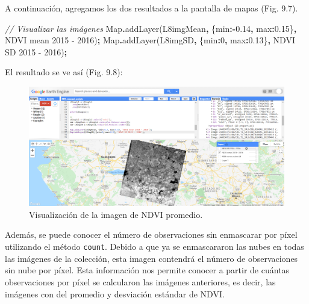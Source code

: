 \documentclass[
  12pt,
  letterpaper,
  twoside]{book}
\newenvironment{Shaded}{\begin{snugshade}}{\end{snugshade}}
\newcommand{\BuiltInTok}[1]{#1}
\newcommand{\CommentTok}[1]{\textcolor[rgb]{0.56,0.35,0.01}{\textit{#1}}}
\newcommand{\DataTypeTok}[1]{\textcolor[rgb]{0.13,0.29,0.53}{#1}}
\newcommand{\DecValTok}[1]{\textcolor[rgb]{0.00,0.00,0.81}{#1}}
\newcommand{\FloatTok}[1]{\textcolor[rgb]{0.00,0.00,0.81}{#1}}
\newcommand{\FunctionTok}[1]{\textcolor[rgb]{0.00,0.00,0.00}{#1}}
\newcommand{\NormalTok}[1]{#1}
\newcommand{\OperatorTok}[1]{\textcolor[rgb]{0.81,0.36,0.00}{\textbf{#1}}}
\newcommand{\StringTok}[1]{\textcolor[rgb]{0.31,0.60,0.02}{#1}}
\begin{document}
A continuación, agregamos los dos resultados a la pantalla de mapas (Fig. 9.7).

\begin{Shaded}
\begin{Highlighting}[]
\CommentTok{// Visualizar las imágenes}
\BuiltInTok{Map}\OperatorTok{.}\FunctionTok{addLayer}\NormalTok{(L8imgMean}\OperatorTok{,}\NormalTok{ \{}\DataTypeTok{min}\OperatorTok{:{-}}\FloatTok{0.14}\OperatorTok{,} \DataTypeTok{max}\OperatorTok{:}\FloatTok{0.15}\NormalTok{\}}\OperatorTok{,} \StringTok{\textquotesingle{}NDVI mean 2015 {-} 2016\textquotesingle{}}\NormalTok{)}\OperatorTok{;}
\BuiltInTok{Map}\OperatorTok{.}\FunctionTok{addLayer}\NormalTok{(L8imgSD}\OperatorTok{,}\NormalTok{ \{}\DataTypeTok{min}\OperatorTok{:}\DecValTok{0}\OperatorTok{,} \DataTypeTok{max}\OperatorTok{:}\FloatTok{0.13}\NormalTok{\}}\OperatorTok{,} \StringTok{\textquotesingle{}NDVI SD 2015 {-} 2016\textquotesingle{}}\NormalTok{)}\OperatorTok{;}
\end{Highlighting}
\end{Shaded}

El resultado se ve así (Fig. 9.8):

\begin{figure}[btp]

{\centering \includegraphics[width=1\linewidth]{Img/imNDVI} 

}

\caption{Visualización de la imagen de NDVI promedio.}\label{fig:unnamed-chunk-161}
\end{figure}

Además, se puede conocer el número de observaciones sin enmascarar por píxel utilizando el método \texttt{count}. Debido a que ya se enmascararon las nubes en todas las imágenes de la colección, esta imagen contendrá el número de observaciones sin nube por píxel. Esta información nos permite conocer a partir de cuántas observaciones por píxel se calcularon las imágenes anteriores, es decir, las imágenes con del promedio y desviación estándar de NDVI.
\end{document}
